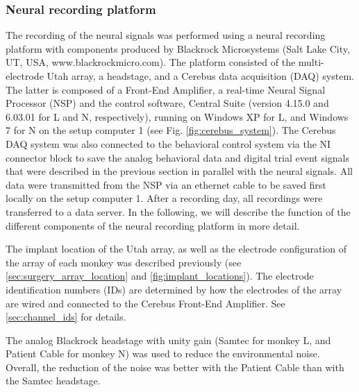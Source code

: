 {\subsubsection{Neural recording platform}
\label{sec:neural_recording_platform}
The recording of the neural signals was performed using a neural recording platform with components produced by Blackrock Microsystems (Salt Lake City, UT, USA, www.blackrockmicro.com). The platform consisted of the multi-electrode Utah array, a headstage, and a Cerebus data acquisition (DAQ) system. The latter is composed of a Front-End Amplifier, a real-time Neural Signal Processor (NSP) and the control software, Central Suite (version 4.15.0 and 6.03.01 for L and N, respectively), running on Windows XP for L, and Windows 7 for N on the setup computer 1 (see Fig. \cref{fig:cerebus_system}). The Cerebus DAQ system was also connected to the behavioral control system via the NI connector block to save the analog behavioral data and digital trial event signals that were described in the previous section in parallel with the neural signals. All data were transmitted from the NSP via an ethernet cable to be saved first locally on the setup computer 1. After a recording day, all recordings were transferred to a data server. In the following, we will describe the function of the different components of the neural recording platform in more detail.

The implant location of the Utah array, as well as the electrode configuration of the array of each monkey was described previously (see \cref{sec:surgery_array_location} and \cref{fig:implant_locations}). The electrode identification numbers (IDs) are determined by how the electrodes of the array are wired and connected to the Cerebus Front-End Amplifier. See \ref{sec:channel_ids} for details.

The analog Blackrock headstage with unity gain (Samtec for monkey L, and Patient Cable for monkey N) was used to reduce the environmental noise. Overall, the reduction of the noise was better with the Patient Cable than with the Samtec headstage.

}
